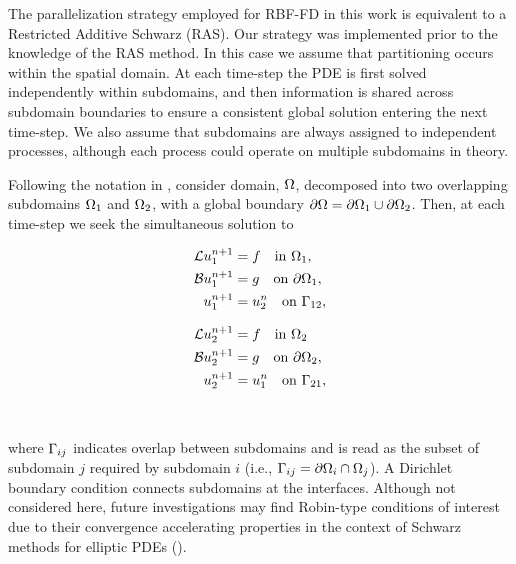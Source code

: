 \documentclass{report}
\begin{document}
The parallelization strategy employed for RBF-FD in this work is equivalent to a Restricted Additive Schwarz (RAS). Our strategy was implemented prior to the knowledge of the RAS method. In this case we assume that partitioning occurs within the spatial domain. At each time-step the PDE is first solved independently within subdomains, and then information is shared across subdomain boundaries to ensure a consistent global solution entering the next time-step. We also assume that subdomains are always assigned to independent processes, although each process could operate on multiple subdomains in theory. 

Following the notation in \cite{StCyr2007}, consider domain, $\Omega$, decomposed into two overlapping subdomains $\Omega_1$ and $\Omega_2$, with a global boundary $\partial\Omega = \partial\Omega_1 \cup \partial\Omega_2$. Then, at each time-step we seek the simultaneous solution to
\begin{center}
\begin{minipage}{0.4\linewidth}
\begin{align*}
\mathcal{L}u_{1}^{n+1} & = f \ \ \text{ in }\Omega_1,\\
\mathcal{B}u_{1}^{n+1} &= g \ \ \text{ on }\partial\Omega_1, \\
u_{1}^{n+1} & = u_2^{n} \ \ \text{ on }\Gamma_{12}, 
\end{align*}
\end{minipage}
\begin{minipage}{0.4\linewidth} 
\begin{align}
\mathcal{L}u_{2}^{n+1} & = f \ \ \text{ in }\Omega_2 \nonumber \\
\mathcal{B}u_{2}^{n+1} & = g \ \ \text{ on }\partial\Omega_2, \label{eq:rasm_example} \\
u_{2}^{n+1} & = u_1^{n} \ \ \text{ on }\Gamma_{21},  \nonumber
\end{align}
\end{minipage}
\end{center}
\ 

\noindent where $\Gamma_{ij}$ indicates overlap between subdomains and is read as the subset of subdomain $j$ required by subdomain $i$ (i.e., $\Gamma_{ij} = \partial\Omega_i \cap \Omega_j$). A Dirichlet boundary condition connects subdomains at the interfaces. Although not considered here, future investigations may find Robin-type conditions of interest due to their convergence accelerating properties in the context of Schwarz methods for elliptic PDEs (\cite{StCyr2007}). 
\end{document}
